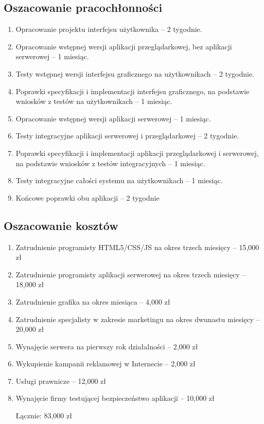 \documentclass[12pt,a4paper]{report}
\newcommand{\blankpage}{
\newpage
\thispagestyle{empty}
\mbox{}
\newpage
}
\begin{document}
\subsection{Oszacowanie pracochłonności}
\begin{enumerate}
	\item Opracowanie projektu interfejsu użytkownika -- 2 tygodnie.
	\item Opracowanie wstępnej wersji aplikacji przeglądarkowej, bez aplikacji serwerowej -- 1 miesiąc.
	\item Testy wstępnej wersji interfejsu graficznego na użytkownikach -- 2 tygodnie.
	\item Poprawki specyfikacji i implementacji interfejsu graficznego, na podstawie wniosków z testów na użytkownikach -- 1 miesiąc.
	\item Opracowanie wstępnej wersji aplikacji serwerowej -- 1 miesiąc.
	\item Testy integracyjne aplikacji serwerowej i przeglądarkowej -- 2 tygodnie.
	\item Poprawki specyfikacji i implementacji aplikacji przeglądarkowej i serwerowej, na podstawie wniosków z testów integracyjnych -- 1 miesiąc.
	\item Testy integracyjne całości systemu na użytkownikach -- 1 miesiąc.
	\item Końcowe poprawki obu aplikacji -- 2 tygodnie 
\end{enumerate}
\subsection{Oszacowanie kosztów}
\begin{enumerate}
	\item Zatrudnienie programisty HTML5/CSS/JS na okres trzech miesięcy -- 15,000 zł
	\item Zatrudnienie programisty aplikacji serwerowej na okres trzech miesięcy -- 18,000 zł
	\item Zatrudnienie grafika na okres miesiąca -- 4,000 zł
	\item Zatrudnienie specjalisty w zakresie marketingu na okres dwunastu miesięcy -- 20,000 zł
	\item Wynajęcie serwera na pierwszy rok działalności -- 2,000 zł
	\item Wykupienie kampanii reklamowej w Internecie -- 2,000 zł
	\item Usługi prawnicze -- 12,000 zł
	\item Wynajęcie firmy testującej bezpieczeństwo aplikacji -- 10,000 zł

Łącznie: 83,000 zł
\end{enumerate}
\newpage
\blankpage
\end{document}
